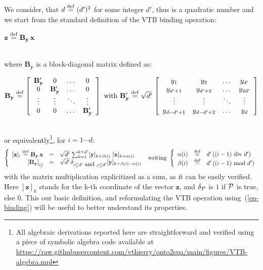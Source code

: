 \documentclass[sn-mathphys]{sn-jnl}
\newcommand{\defq}{\stackrel {\rm def}{=}}
\newcommand{\eqline}[1]{~\vspace{0.1cm}\\\centerline{$#1$}\vspace{0.1cm}\\}
\begin{document}
\begin{appendices}
We consider, that $d \defq (d')^2$ for some integer $d'$, thus is a quadratic number and we start from the standard definition of the VTB binding operation:
\eqline{\mathbf{z} \defq \mathbf{B_y} \, \mathbf{x}}
where $\mathbf{B_y}$ is a block-diagonal matrix defined as:
\eqline{\mathbf{B_y} \defq 
\left[\begin{array}{cccc}
    \mathbf{B_y'} &    0 & \dots &   0 \\
       0 & \mathbf{B_y'} & \dots &    0 \\
    \vdots & \vdots & \ddots & \vdots  \\
       0 &    0 & \dots & \mathbf{B_y'}
    \end{array}\right]
\mbox{ with } 
\mathbf{B_y'}  \defq \sqrt{d'} \,
\left[\begin{array}{cccc}
    y_1            & y_2            & \dots  & y_{d'}  \\
    y_{d' + 1}     & y_{d' + 2}     & \dots  & y_{2d'} \\
    \vdots         & \vdots         & \ddots & \vdots  \\
    y_{d - d' + 1} & y_{d - d' + 2} & \dots  & y_d
\end{array}\right]}
or equivalently\footnote{All algebraic derivations reported here are straightforward and verified using a piece of symbolic algebra code available at \url{https://raw.githubusercontent.com/vthierry/onto2spa/main/figures/VTB-algebra.mpl}}, for $i = 1 \cdots d$:
\begin{equation}\label{eq-binding}
  \left\{\begin{array}{rcl}
      [\mathbf{z}]_i \defq \mathbf{B_y} \, \mathbf{x} &=& \sqrt{d'} \, \sum_{k = 1}^{k = d'} [\mathbf{y}]_{k + \beta(i)} \; [\mathbf{x}]_{k + \alpha(i)} \\
      \left[\mathbf{B_y}\right]_{ij} &=& \sqrt{d'} \, \delta_{i \le d' \mbox{ and } j \le d'} [\mathbf{y}]_{k + \beta(i) - \alpha(i)} \\
  \end{array}\right.
\mbox{ writing } \left\{\begin{array}{rcl}
  \alpha(i) &\defq& d' \, ((i-1) \mbox{ div } d') \\
  \beta(i)  &\defq& d' \, ((i-1) \mbox{ mod } d') \\
\end{array}\right.
\end{equation}
with the matrix multiplication explicitized as a sum, as it can be easily verified. Here $[\mathbf{z}]_k$ stands for the k-th coordinate of the vector $\mathbf{z}$, and $\delta_{\cal P}$ is $1$ if ${\cal P}$ is true, else $0$. This our basic definition, and reformulating the VTB operation using~(\ref{eq-binding}) will be useful to better understand its properties.


\end{appendices}
\end{document}
